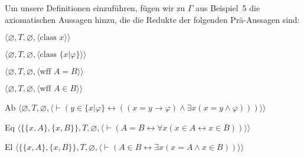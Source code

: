 Um unsere Definitionen einzuführen, fügen wir zu $\Gamma$ aus Beispiel~5 die axiomatischen Aussagen hinzu, die die Redukte der folgenden Prä-Aussagen sind:
\begin{list}{}{\itemsep 0.0pt}
      \item[] $\langle\varnothing,T,\varnothing,
               \langle \mbox{class\ }x\rangle\rangle$
      \item[] $\langle\varnothing,T,\varnothing,
               \langle \mbox{class\ }\{x|\varphi\}\rangle\rangle$
      \item[] $\langle\varnothing,T,\varnothing,
               \langle \mbox{wff\ }A=B\rangle\rangle$
      \item[] $\langle\varnothing,T,\varnothing,
               \langle \mbox{wff\ }A\in B\rangle\rangle$
      \item[Ab] $\langle\varnothing,T,\varnothing,
               \langle \vdash ( y \in \{ x |\varphi\} \leftrightarrow
                  ( ( x = y \to\varphi) \wedge \exists x ( x = y
                  \wedge\varphi) ))
               \rangle\rangle$
      \item[Eq] $\langle\{\{x,A\},\{x,B\}\},T,\varnothing,
               \langle \vdash ( A = B \leftrightarrow
               \forall x ( x \in A \leftrightarrow x \in B ) )
               \rangle\rangle$
      \item[El] $\langle\{\{x,A\},\{x,B\}\},T,\varnothing,
               \langle \vdash ( A \in B \leftrightarrow \exists x
               ( x = A \wedge x \in B ) )
               \rangle\rangle$
\end{list}
